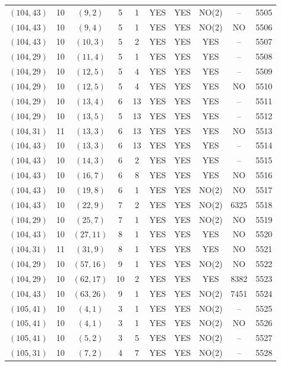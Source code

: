 \begin{longtable}{|c|c|c|c|c|c|c|c|c|c|}
$(104, 43)$ & 10 & $(9, 2)$ & 5 & 1 & YES & YES & NO(2) & -- & 5505\\
$(104, 43)$ & 10 & $(9, 4)$ & 5 & 1 & YES & YES & NO(2) & NO & 5506\\
$(104, 43)$ & 10 & $(10, 3)$ & 5 & 2 & YES & YES & YES & -- & 5507\\
$(104, 29)$ & 10 & $(11, 4)$ & 5 & 1 & YES & YES & YES & -- & 5508\\
$(104, 29)$ & 10 & $(12, 5)$ & 5 & 4 & YES & YES & YES & -- & 5509\\
$(104, 29)$ & 10 & $(12, 5)$ & 5 & 4 & YES & YES & YES & NO & 5510\\
$(104, 29)$ & 10 & $(13, 4)$ & 6 & 13 & YES & YES & YES & -- & 5511\\
$(104, 29)$ & 10 & $(13, 5)$ & 5 & 13 & YES & YES & YES & -- & 5512\\
$(104, 31)$ & 11 & $(13, 3)$ & 6 & 13 & YES & YES & YES & NO & 5513\\
$(104, 43)$ & 10 & $(13, 3)$ & 6 & 13 & YES & YES & YES & -- & 5514\\
$(104, 43)$ & 10 & $(14, 3)$ & 6 & 2 & YES & YES & YES & -- & 5515\\
$(104, 43)$ & 10 & $(16, 7)$ & 6 & 8 & YES & YES & YES & NO & 5516\\
$(104, 43)$ & 10 & $(19, 8)$ & 6 & 1 & YES & YES & NO(2) & NO & 5517\\
$(104, 43)$ & 10 & $(22, 9)$ & 7 & 2 & YES & YES & NO(2) & 6325 & 5518\\
$(104, 29)$ & 10 & $(25, 7)$ & 7 & 1 & YES & YES & NO(2) & NO & 5519\\
$(104, 43)$ & 10 & $(27, 11)$ & 8 & 1 & YES & YES & YES & NO & 5520\\
$(104, 31)$ & 11 & $(31, 9)$ & 8 & 1 & YES & YES & YES & NO & 5521\\
$(104, 29)$ & 10 & $(57, 16)$ & 9 & 1 & YES & YES & NO(2) & NO & 5522\\
$(104, 29)$ & 10 & $(62, 17)$ & 10 & 2 & YES & YES & YES & 8382 & 5523\\
$(104, 43)$ & 10 & $(63, 26)$ & 9 & 1 & YES & YES & NO(2) & 7451 & 5524\\
$(105, 41)$ & 10 & $(4, 1)$ & 3 & 1 & YES & YES & NO(2) & -- & 5525\\
$(105, 41)$ & 10 & $(4, 1)$ & 3 & 1 & YES & YES & NO(2) & NO & 5526\\
$(105, 41)$ & 10 & $(5, 2)$ & 3 & 5 & YES & YES & NO(2) & -- & 5527\\
$(105, 31)$ & 10 & $(7, 2)$ & 4 & 7 & YES & YES & NO(2) & -- & 5528\\

\end{longtable}
